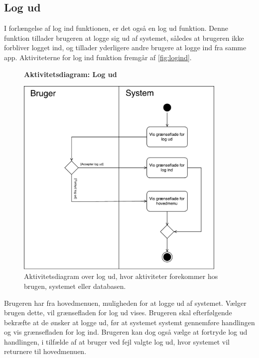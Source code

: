 \subsection*{Log ud}
I forlængelse af log ind funktionen, er det også en log ud funktion. Denne funktion tillader brugeren at logge sig ud af systemet, således at brugeren ikke forbliver logget ind, og tillader yderligere andre brugere at logge ind fra samme app.
Aktiviteterne for log ind funktion fremgår af \autoref{fig:logind}.

\begin{figure} [H]
\centering
\textbf{Aktivitetsdiagram: Log ud}\par\medskip
\includegraphics[width=0.9\textwidth]{figures/aktivitetsdiagram/Logud}
\caption{Aktivitetsdiagram over log ud, hvor aktiviteter forekommer hos brugen, systemet eller databasen.}
\label{fig:logud}
\end{figure}

Brugeren har fra hovedmenuen, muligheden for at logge ud af systemet. Vælger brugen dette, vil grænsefladen for log ud vises. 
Brugeren skal efterfølgende bekræfte at de ønsker at logge ud, før at systemet systemt gennemføre handlingen og vis grænsefladen for log ind. Brugeren kan dog også vælge at fortryde log ud handlingen, i tilfælde af at bruger ved fejl valgte log ud, hvor systemet vil returnere til hovedmenuen.  
